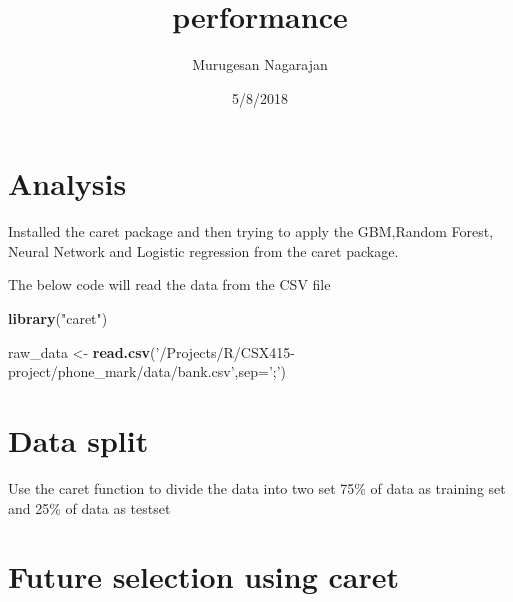 \documentclass[]{article}
\title{performance}
\author{Murugesan Nagarajan}
\date{5/8/2018}
\newenvironment{Shaded}{\begin{snugshade}}{\end{snugshade}}
\newcommand{\KeywordTok}[1]{\textcolor[rgb]{0.13,0.29,0.53}{\textbf{#1}}}
\newcommand{\DataTypeTok}[1]{\textcolor[rgb]{0.13,0.29,0.53}{#1}}
\newcommand{\FloatTok}[1]{\textcolor[rgb]{0.00,0.00,0.81}{#1}}
\newcommand{\StringTok}[1]{\textcolor[rgb]{0.31,0.60,0.02}{#1}}
\newcommand{\OtherTok}[1]{\textcolor[rgb]{0.56,0.35,0.01}{#1}}
\newcommand{\OperatorTok}[1]{\textcolor[rgb]{0.81,0.36,0.00}{\textbf{#1}}}
\newcommand{\NormalTok}[1]{#1}
\begin{document}
\maketitle

\section{Analysis}\label{analysis}

Installed the caret package and then trying to apply the GBM,Random
Forest, Neural Network and Logistic regression from the caret package.

The below code will read the data from the CSV file

\begin{Shaded}
\begin{Highlighting}[]
\KeywordTok{library}\NormalTok{(}\StringTok{"caret"}\NormalTok{)}

\NormalTok{raw_data <-}\StringTok{ }\KeywordTok{read.csv}\NormalTok{(}\StringTok{'/Projects/R/CSX415-project/phone_mark/data/bank.csv'}\NormalTok{,}\DataTypeTok{sep=}\StringTok{';'}\NormalTok{)}
\end{Highlighting}
\end{Shaded}

\section{Data split}\label{data-split}

Use the caret function to divide the data into two set 75\% of data as
training set and 25\% of data as testset

\begin{Shaded}
\end{Shaded}

\section{Future selection using
caret}\label{future-selection-using-caret}

\begin{Shaded}
\end{Shaded}
\end{document}
